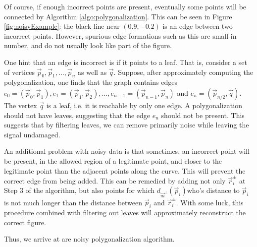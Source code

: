 \documentclass{article}
\numberwithin{cntr}{section}
\numberwithin{equation}{section}
\newcommand{\vp}[0]{{\vec{p}}}
\newcommand{\vq}[0]{{\vec{q}}}
\newcommand{\vr}[0]{{\vec{r}}}
\newcommand{\vm}[0]{{\vec{m}}}
\begin{document}
Of course, if enough incorrect points are present, eventually some points will be connected by Algorithm \ref{algo:polygonalization}. This can be seen in Figure \ref{fig:noisyExample}: the black line near $(0.9, -0.2)$ is an edge between two incorrect points. However, spurious edge formations such as this are small in number, and do not usually look like part of the figure.

One hint that an edge is incorrect is if it points to a leaf. That is, consider a set of vertices $\vp_{0}, \vp_{1}, \ldots, \vp_{n}$ as well as $\vq$. Suppose, after approximately computing the polygonalization, one finds that the graph contains edges $e_{0} = (\vp_{0}, \vp_{1}), e_{1} = (\vp_{1}, \vp_{2}), \ldots, e_{n-1} = (\vp_{n-1}, \vp_{n})$ and $e_{n} = (\vp_{n/2}, \vq)$. The vertex $\vq$ is a leaf, i.e. it is reachable by only one edge. A polygonalization should not have leaves, suggesting that the edge $e_{n}$ should not be present. This suggests that by filtering leaves, we can remove primarily noise while leaving the signal undamaged.

An additional problem with noisy data is that sometimes, an incorrect point will be present, in the allowed region of a legitimate point, and closer to the legitimate point than the adjacent points along the curve. This will prevent the correct edge from being added. This can be remedied by adding not only $\vr_{i}^{\pm}$ at Step 3 of the algorithm, but also points for which $d_{\vm^{\perp}}(\vp_{i})$who's distance to $\vp_{i}$ is not much longer than the distance between $\vp_{i}$ and $\vr_{i}^{\pm}$. With some luck, this procedure combined with filtering out leaves will approximately reconstruct the correct figure.

Thus, we arrive at are noisy polygonalization algorithm.
\end{document}
